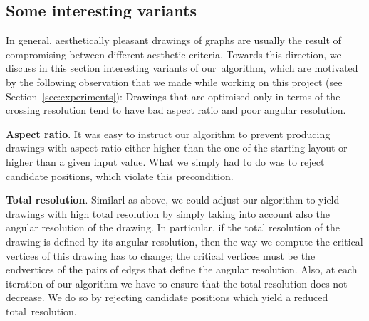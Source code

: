 \documentclass[runningheads]{llncs}
\newcommand{\myparagraph}[1]{\smallskip\noindent\textbf{#1}.}
\begin{document}
\subsection{Some interesting variants}
\label{ssec:variants}

In general, aesthetically pleasant drawings of graphs are usually the result of compromising between different aesthetic criteria. Towards this direction, we discuss in this section interesting variants of our~algorithm, which are motivated by the following observation that we made while working on this project (see Section~\ref{sec:experiments}): Drawings that are optimised only in terms of the crossing resolution tend to have bad aspect ratio
and poor angular resolution.

\myparagraph{Aspect ratio}
%
It was easy to instruct our algorithm to prevent producing drawings with aspect ratio either higher than the one of the starting layout or higher than a given input value. What we simply had to do was to reject candidate positions, which violate this precondition.

\myparagraph{Total resolution}
%
Similarl as above, we could adjust our algorithm to yield drawings with high total resolution by simply taking into account also the angular resolution of the drawing. In particular, if the total resolution of the drawing is defined by its angular resolution, then the way we compute the critical vertices of this drawing has to change; the critical vertices must be the endvertices of the pairs of edges that define the angular resolution. Also, at each iteration of our algorithm we have to ensure that the total resolution does not decrease. We do so by rejecting candidate positions which yield a reduced total~resolution.
\end{document}
